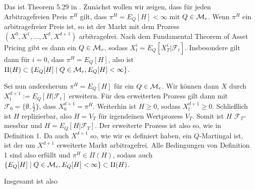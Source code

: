 \documentclass{article}
\begin{document}
Das ist Theorem 5.29 in \cite{foellmer2016}.
Zunächst wollen wir zeigen, dass für jeden Arbitragefreien Preis $\pi^H$ gilt, dass $\pi^H=E_Q[H]<\infty$ mit $Q\in{\cal M}_e$.
Wenn $\pi^H$ ein arbitragefreier Preis ist, so ist der Markt mit dem Prozess $(X^0,X^1,\dots,X^d,X^{d+1})$ arbitragefrei.
Nach dem Fundamental Theorem of Asset Pricing gibt es dann ein $Q\in{\cal M}_e$, sodass $X^i_t=E_Q[X^i_T|\mathscr{F}_t]$.
Insbesondere gilt dann für $i=0$, dass $\pi^H=E_Q[H]$, also ist $\Pi(H)\subset\{E_Q[H]\mid Q\in{\cal M}_e, E_Q[H]<\infty\}$.

Sei nun andersherum $\pi^H=E_Q[H]$ für ein $Q\in{\cal M}_e$.
Wir können dann $X$ durch $X^{d+1}_t:=E_Q[H|\mathscr{F}_t]$ erweitern.
Für den erweiterten Prozess gilt dann mit $\mathscr{F}_0=\{\emptyset,\frac{1}{2}\}$, dass $X^{d+1}_0=\pi^H$.
Weiterhin ist $H\geq0$, sodass $X^{d+1}_t\geq0$.
Schließlich ist $H$ replizierbar, also $H=V_T$ für irgendeinen Wertprozess $V_T$.
Somit ist $H$ $\mathscr{F}_T$-messbar und $H=E_Q[H|\mathscr{F}_T]$.
Der erweiterte Prozess ist also so, wie in Definition 1.
Da auch $X^{d+1}$ so, wie wir es definiert haben, ein $Q$-Martingal ist, ist der um $X^{d+1}$ erweiterte Markt arbitragefrei.
Alle Bedingungen von Definition 1 sind also erfüllt und $\pi^H\in \Pi(H)$, sodass auch $\{E_Q[H]\mid Q\in{\cal M}_e, E_Q[H]<\infty\}\subset\Pi(H)$.

Insgesamt ist also 

\end{document}
